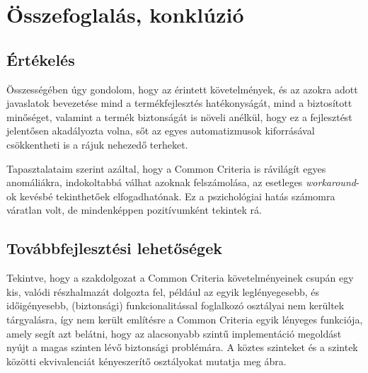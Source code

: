 \chapter{Összefoglalás, konklúzió}

\section{Értékelés}

Összességében úgy gondolom, hogy az érintett követelmények, és az azokra adott javaslatok bevezetése
mind a termékfejlesztés hatékonyságát, mind a biztosított minőséget, valamint a termék biztonságát
is növeli anélkül, hogy ez a fejlesztést jelentősen akadályozta volna, sőt az egyes automatizmusok
kiforrásával csökkentheti is a rájuk nehezedő terheket.

Tapasztalataim szerint azáltal, hogy a Common Criteria is rávilágít egyes anomáliákra, indokoltabbá
válhat azoknak felszámolása, az esetleges \emph{workaround}-ok kevésbé tekinthetőek elfogadhatónak.
Ez a pszichológiai hatás számomra váratlan volt, de mindenképpen pozitívumként tekintek rá.

\section{Továbbfejlesztési lehetőségek}
Tekintve, hogy a szakdolgozat a Common Criteria követelményeinek csupán egy kis, valódi részhalmazát
dolgozta fel, például az egyik leglényegesebb, és időigényesebb, (biztonsági) funkcionalitással
foglalkozó osztályai nem kerültek tárgyalásra, így nem került említésre a Common Criteria egyik
lényeges funkciója, amely segít azt belátni, hogy az alacsonyabb szintű implementáció megoldást
nyújt a magas szinten lévő biztonsági problémára. A köztes szinteket és a szintek közötti
ekvivalenciát kényeszerítő osztályokat mutatja meg  ábra.

